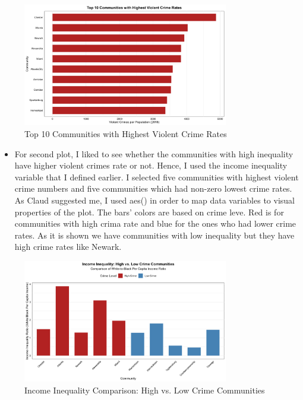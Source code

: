 \documentclass{article}
\begin{document}
\begin{figure}[H] %
    \centering
    \includegraphics[width=0.8\textwidth]{PS6a_Karbalaei.png}
    \caption{Top 10 Communities with Highest Violent Crime Rates}
    \label{fig:top10communities}
\end{figure}

\begin{itemize}
    \item For second plot, I liked to see whether the communities with high inequality have higher violent crimes rate or not. Hence, I used the income inequality variable that I defined earlier. I selected five communities with highest violent crime numbers and five communities which had non-zero lowest crime rates. As Claud suggested me, I used aes() in order to map data variables to visual properties of the plot. The bars' colors are based on crime leve. Red is for communities with high crima rate and blue for the ones who had lower crime rates. As it is shown we have communities with low inequality but they have high crime rates like Newark. 
\end{itemize}

\begin{figure}[H]
    \centering
    \includegraphics[width=0.8\textwidth]{PS6b_Karbalaei.png}
    \caption{Income Inequality Comparison: High vs. Low Crime Communities}
    \label{fig:inequality}
\end{figure}
\end{document}
